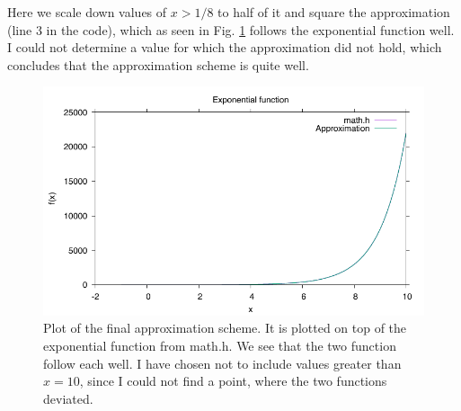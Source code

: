 \documentclass[12pt,a4paper,oneside]{article}
\begin{document}
Here we scale down values of $x>1/8$ to half of it and square the approximation (line 3 in the code), which as seen in Fig. \ref{fig:plot2} follows the exponential function well. I could not determine a value for which the approximation did not hold, which concludes that the approximation scheme is quite well.
\begin{figure}[H]
    \centering
    \includegraphics[width=\textwidth]{plot2.pdf}
    \caption{Plot of the final approximation scheme. It is plotted on top of the exponential function from math.h. We see that the two function follow each well. I have chosen not to include values greater than $x=10$, since I could not find a point, where the two functions deviated.}
    \label{fig:plot2}
\end{figure}
\end{document}
